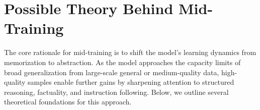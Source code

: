 \section{Possible Theory Behind Mid-Training}
The core rationale for mid-training is to shift the model's learning dynamics from memorization to abstraction. As the model approaches the capacity limits of broad generalization from large-scale general or medium-quality data, high-quality samples enable further gains by sharpening attention to structured reasoning, factuality, and instruction following. Below, we outline several theoretical foundations for this approach.



